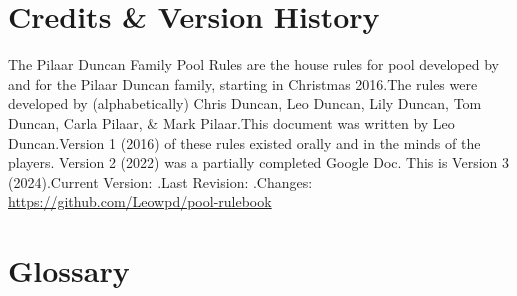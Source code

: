 
\renewcommand{\thesection}{\Alph{section}}

\section{Credits \& Version History} \label{credits}

\setlength{\parindent}{0pt}

The Pilaar Duncan Family Pool Rules are the house rules for pool developed by and for the Pilaar Duncan family, starting in Christmas 2016.\standardspace[large]
The rules were developed by (alphabetically) Chris Duncan, Leo Duncan, Lily Duncan, Tom Duncan, Carla Pilaar, \& Mark Pilaar.\standardspace[large]
This document was written by Leo Duncan.\standardspace[large]
Version 1 (2016) of these rules existed orally and in the minds of the players. Version 2 (2022) was a partially completed Google Doc. This is Version 3 (2024).\standardspace[large]
Current Version: \currentversion.\standardspace[large]
Last Revision: \currentversiondate.\standardspace[large]
Changes: {\small \url{https://github.com/Leowpd/pool-rulebook}}

\newpage

\section{Glossary} \label{glossary}

